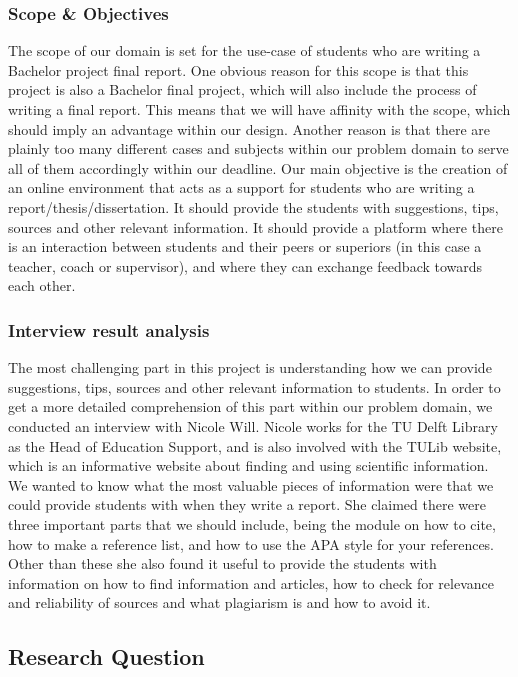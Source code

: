 \subsubsection{Scope \& Objectives}

The scope of our domain is set for the use-case of students who are writing a Bachelor project final report. One obvious reason for this scope is that this project is also a Bachelor final project, which will also include the process of writing a final report. This means that we will have affinity with the scope, which should imply an advantage within our design. Another reason is that there are plainly too many different cases and subjects within our problem domain to serve all of them accordingly within our deadline.
Our main objective is the creation of an online environment that acts as a support for students who are writing a report/thesis/dissertation. It should provide the students with suggestions, tips, sources and other relevant information. It should provide a platform where there is an interaction between students and their peers or superiors (in this case a teacher, coach or supervisor), and where they can exchange feedback towards each other.

\subsubsection{Interview result analysis} %

The most challenging part in this project is understanding how we can provide suggestions, tips, sources and other relevant information to students. In order to get a more detailed comprehension of this part within our problem domain, we conducted an interview with Nicole Will. Nicole works for the TU Delft Library as the Head of Education Support, and is also involved with the TULib website, which is an informative website about finding and using scientific information.
We wanted to know what the most valuable pieces of information were that we could provide students with when they write a report. She claimed there were three important parts that we should include, being the module on how to cite\cite{tulib:howtocite}, how to make a reference list, and how to use the APA\cite{tulib:apa} style for your references.
Other than these she also found it useful to provide the students with information on how to find information and articles, how to check for relevance and reliability of sources and what plagiarism is and how to avoid it.

\subsection{Research Question}


